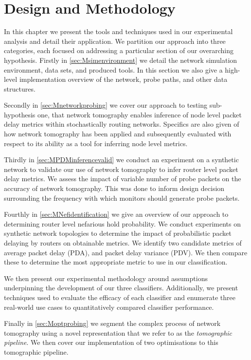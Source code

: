 \chapter{Design and Methodology}
\label{cha:methodology}
In this chapter we present the tools and techniques used in our experimental analysis and detail their application. We partition our approach into three categories, each focused on addressing a particular section of our overarching hypothesis. Firstly in \cref{sec:Msimenvironment} we detail the network simulation environment, data sets, and produced tools. In this section we also give a high-level implementation overview of the network, probe paths, and other data structures.\par
Secondly in \cref{sec:Mnetworkprobing} we cover our approach to testing sub-hypothesis one, that network tomography enables inference of node level packet delay metrics within stochastically routing networks. Specifics are also given of how network tomography has been applied and subsequently evaluated with respect to its ability as a tool for inferring node level metrics.\par
Thirdly in \cref{sec:MPDMinferencevalid} we conduct an experiment on a synthetic network to validate our use of network tomography to infer router level packet delay metrics. We assess the impact of variable number of probe packets on the accuracy of network tomography. This was done to inform design decision surrounding the frequency with which monitors should generate probe packets.\par
Fourthly in \cref{sec:MNefidentification} we give an overview of our approach to determining router level nefarious hold probability. We conduct experiments on synthetic network topologies to determine the impact of probabilistic packet delaying by routers on obtainable metrics. We identify two candidate metrics of average packet delay (PDA), and packet delay variance (PDV). We then compare these to determine the most appropriate metric to use in our classification.\par
We then present our experimental methodology around assumptions underpinning the development of our three classifiers. Additionally, we present techniques used to evaluate the efficacy of each classifier and enumerate three real-world use cases to quantitatively compared classifier performance.\par
Finally in \cref{sec:Moptprobing} we segment the complex process of network tomography using a novel representation that we refer to as the \textit{tomographic pipeline}. We then cover our implementation of two optimisations to this tomographic pipeline.

